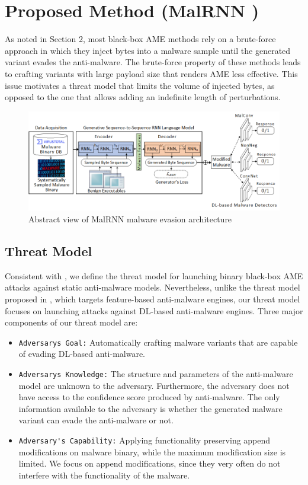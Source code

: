 \documentclass[letterpaper]{article}
\newcommand{\malrnn}{M\lowercase{a}lRNN }
\begin{document}
\section{Proposed Method (\malrnn)}
\label{method}

As noted in Section 2, most black-box AME methods rely on a brute-force approach in which they inject bytes into a malware sample until the generated variant evades the anti-malware. The brute-force property of these methods leads to crafting variants with large payload size that renders AME less effective. This issue motivates a threat model that limits the volume of injected bytes, as opposed to the one that allows adding an indefinite length of perturbations.

\begin{figure}[t]
    \centering
    \includegraphics[width=1\textwidth]{Model_Illustration.png}
    \caption{Abstract view of \malrnn malware evasion architecture}
    \label{architecture}
\end{figure}

\subsection{Threat Model}
Consistent with \cite{anderson2018learning}, we define the threat model for launching binary black-box AME attacks against static anti-malware models. Nevertheless, unlike the threat model proposed in \cite{anderson2018learning}, which targets feature-based anti-malware engines, our threat model focuses on launching attacks against DL-based anti-malware engines. Three major components of our threat model are:
    
    \begin{itemize}
        \item{\verb|Adversarys Goal:|} Automatically crafting malware variants that are capable of evading DL-based anti-malware.
        \item{\verb|Adversarys Knowledge:|} The structure and parameters of the anti-malware model are unknown to the adversary. Furthermore, the adversary does not have access to the confidence score produced by anti-malware. The only information available to the adversary is whether the generated malware variant can evade the anti-malware or not.
        \item{\verb|Adversary's Capability:|} Applying functionality preserving append modifications on malware binary, while the maximum modification size is limited. We focus on append modifications, since they very often do not interfere with the functionality of the malware.
    \end{itemize}
\end{document}
